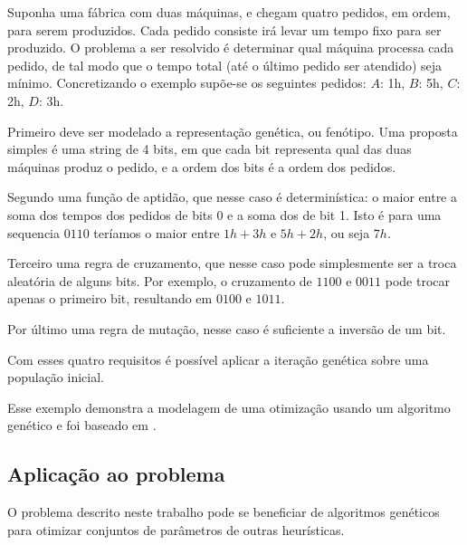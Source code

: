 Suponha uma fábrica com duas máquinas, e chegam quatro pedidos, em ordem, para serem produzidos.
Cada pedido consiste irá levar um tempo fixo para ser produzido.
O problema a ser resolvido é determinar qual máquina processa cada pedido, de tal modo que
o tempo total (até o último pedido ser atendido) seja mínimo.
Concretizando o exemplo supõe-se os seguintes pedidos: $A$: 1h, $B$: 5h, $C$: 2h, $D$: 3h.

Primeiro deve ser modelado a representação genética, ou fenótipo.
Uma proposta simples é uma string de 4 bits, em que cada bit representa qual das duas máquinas produz
o pedido, e a ordem dos bits é a ordem dos pedidos.

Segundo uma função de aptidão, que nesse caso é determinística: o maior entre a soma dos tempos dos pedidos
de bits 0 e a soma dos de bit 1. Isto é para uma sequencia $0110$ teríamos o maior entre $1h + 3h$ e $5h + 2h$,
ou seja $7h$.

Terceiro uma regra de cruzamento, que nesse caso pode simplesmente ser a troca aleatória de alguns bits.
Por exemplo, o cruzamento de $1100$ e $0011$ pode trocar apenas o primeiro bit, resultando em $0100$ e $1011$.

Por último uma regra de mutação, nesse caso é suficiente a inversão de um bit.

Com esses quatro requisitos é possível aplicar a iteração genética sobre uma população inicial.

Esse exemplo demonstra a modelagem de uma otimização usando um algoritmo genético e foi baseado em \cite{vieira2002algogeneticos}.

\subsection{Aplicação ao problema}

O problema descrito neste trabalho pode se beneficiar de algoritmos genéticos para otimizar conjuntos de
parâmetros de outras heurísticas.
